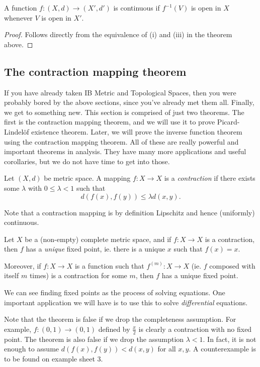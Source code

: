 \documentclass[a4paper]{article}
\begin{document}
\begin{cor}
  A function $f: (X, d) \to (X', d')$ is continuous if $f^{-1}(V)$ is open in $X$ whenever $V$ is open in $X'$.
\end{cor}

\begin{proof}
  Follows directly from the equivalence of (i) and (iii) in the theorem above.
\end{proof}

\subsection{The contraction mapping theorem}
If you have already taken IB Metric and Topological Spaces, then you were probably bored by the above sections, since you've already met them all. Finally, we get to something new. This section is comprised of just two theorems. The first is the contraction mapping theorem, and we will use it to prove Picard-Lindel\"of existence theorem. Later, we will prove the inverse function theorem using the contraction mapping theorem. All of these are really powerful and important theorems in analysis. They have many more applications and useful corollaries, but we do not have time to get into those.

\begin{defi}
  Let $(X, d)$ be metric space. A mapping $f: X \to X$ is a \emph{contraction} if there exists some $\lambda$ with $0 \leq \lambda < 1$ such that
  \[
    d(f(x), f(y)) \leq \lambda d(x, y).
  \]
\end{defi}
Note that a contraction mapping is by definition Lipschitz and hence (uniformly) continuous.

\begin{thm}
  Let $X$ be a (non-empty) complete metric space, and if $f: X \to X$ is a contraction, then $f$ has a \emph{unique} fixed point, ie. there is a unique $x$ such that $f(x) = x$.

  Moreover, if $f: X\to X$ is a function such that $f^{(m)}: X\to X$ (ie. $f$ composed with itself $m$ times) is a contraction for some $m$, then $f$ has a unique fixed point.
\end{thm}
We can see finding fixed points as the process of solving equations. One important application we will have is to use this to solve \emph{differential} equations.

Note that the theorem is false if we drop the completeness assumption. For example, $f: (0, 1) \to (0, 1)$ defined by $\frac{x}{2}$ is clearly a contraction with no fixed point. The theorem is also false if we drop the assumption $\lambda < 1$. In fact, it is not enough to assume $d(f(x), f(y)) < d(x, y)$ for all $x, y$. A counterexample is to be found on example sheet 3.
\end{document}
